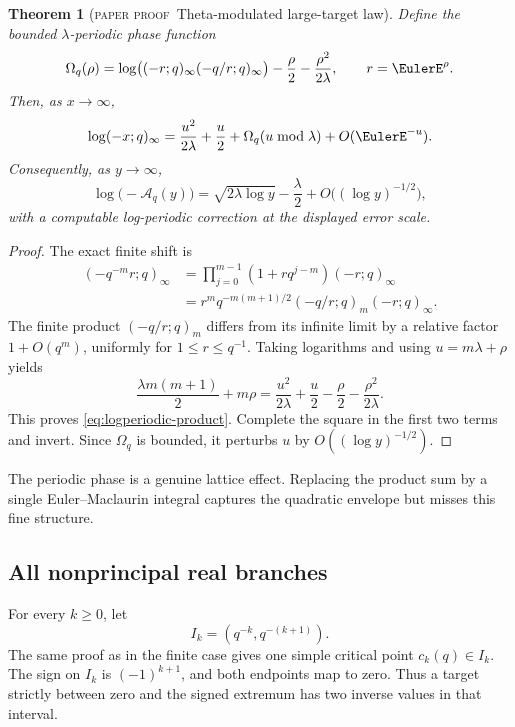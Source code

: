 \documentclass[11pt,oneside]{article}
\newtheorem{theorem}{Theorem}[section]
\theoremstyle{definition}
\theoremstyle{remark}
\theoremstyle{plain}
\theoremstyle{definition}
\theoremstyle{remark}
\newcommand{\Aq}{\mathcal A_q}
\newcommand{\statusproved}{\textcolor{provedgreen}{\textsc{paper proof}}}
\numberwithin{equation}{section}
\numberwithin{figure}{section}
\numberwithin{table}{section}
\let\reportsubsection\subsection
\let\reportsubsubsection\subsubsection
\let\section\reportsubsection
\let\subsection\reportsubsubsection
\begin{document}
\begin{theorem}[\statusproved\ Theta-modulated large-target law]
Define the bounded \(\lambda\)-periodic phase function
\[
 \Omega_q(\rho)=
 \log\bigl((-r;q)_\infty(-q/r;q)_\infty\bigr)
 -\frac{\rho}{2}-\frac{\rho^2}{2\lambda},
 \qquad r=\EulerE^\rho.
\]
Then, as \(x\to\infty\),
\begin{equation}
 \log(-x;q)_\infty
 =\frac{u^2}{2\lambda}+\frac{u}{2}
 +\Omega_q(u\bmod\lambda)+O(\EulerE^{-u}).
 \label{eq:logperiodic-product}
\end{equation}
Consequently, as \(y\to\infty\),
\begin{equation}
 \log\bigl(-\Aq(y)\bigr)
 =\sqrt{2\lambda\log y}-\frac{\lambda}{2}
 +O\bigl((\log y)^{-1/2}\bigr),
 \label{eq:Aq-large-leading}
\end{equation}
with a computable log-periodic correction at the displayed error scale.
\end{theorem}
\begin{proof}
The exact finite shift is
\begin{align*}
 (-q^{-m}r;q)_\infty
 &=\prod_{j=0}^{m-1}(1+rq^{j-m})(-r;q)_\infty\\
 &=r^m q^{-m(m+1)/2}(-q/r;q)_m(-r;q)_\infty.
\end{align*}
The finite product \((-q/r;q)_m\) differs from its infinite limit by a relative
factor \(1+O(q^m)\), uniformly for \(1\le r\le q^{-1}\).  Taking logarithms and
using \(u=m\lambda+\rho\) yields
\[
 \frac{\lambda m(m+1)}2+m\rho
 =\frac{u^2}{2\lambda}+\frac u2
 -\frac{\rho}{2}-\frac{\rho^2}{2\lambda}.
\]
This proves \eqref{eq:logperiodic-product}.  Complete the square in the first
two terms and invert.  Since \(\Omega_q\) is bounded, it perturbs \(u\) by
\(O((\log y)^{-1/2})\).
\end{proof}

The periodic phase is a genuine lattice effect.  Replacing the product sum by a
single Euler--Maclaurin integral captures the quadratic envelope but misses this
fine structure.

\section{All nonprincipal real branches}
For every \(k\ge0\), let
\[
 I_k=(q^{-k},q^{-(k+1)}).
\]
The same proof as in the finite case gives one simple critical point
\(c_k(q)\in I_k\).  The sign on \(I_k\) is \((-1)^{k+1}\), and both endpoints
map to zero.  Thus a target strictly between zero and the signed extremum has
two inverse values in that interval.
\end{document}
